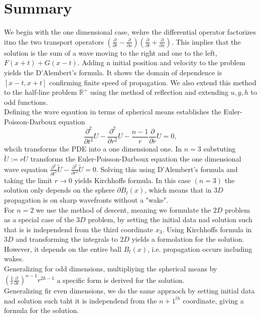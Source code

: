 \documentclass[A4,12pt,twoside]{book}
\begin{document}
\section{Summary}
We begin with the one dimensional case, wehre the differential operator factorizes itno the two transport operators $(\frac{\partial}{\partial t} - \frac{\partial}{\partial x}) (\frac{\partial}{\partial t} + \frac{\partial}{\partial x})$. This implies that the solution is the sum of a wave moving to the right and one to the left, $F(x+t)+G(x-t)$. Adding n initial position and velocity to the problem yields the D'Alembert's formula. It shows the domain of dependence is $[x-t,x+t]$ confirming finite speed of propagation. We also extend this method to the half-line problem $\mathbb{R}^+$ using the method of reflection and extending $u,g,h$ to odd functions.\\
Defining the wave eqaution in terms of spherical means establishes the Euler-Poisson-Darboux equation 
\[
\frac{\partial^2}{\partial t^2} U - \frac{\partial^2}{\partial r^2} U - \frac{n-1}{r} \frac{\partial}{\partial r} U =0,
\]
whcih transforms the PDE into a one dimensional one. In $n=3$ substuting $\tilde{U} := r U$ transforms the Euler-Poisson-Darboux equation the one dimensional wave equation $\frac{\partial^2}{\partial t^2} \tilde{U} - \frac{\partial^2}{\partial r^2} \tilde{U} =0$. Solving this using D'Alembert's formula and taking the limit $r \to 0$ yields Kirchhoffs formula. In this case $(n=3)$ the solution only depends on the sphere $\partial B_t (x)$, which means that in $3D$ propagation is on sharp wavefronts without a "wake". \\
For $n=2$ we use the method of descent, meaning we formulate the $2D$ problem as a special case of the $3D$ problem, by setting the initial data nad solution such that is is independend from the third coordinate $x_3$. Using Kirchhoffs formula in $3D$ and transforming the integrals to $2D$ yields a formolation for the solution. However, it depends on the entire ball $B_t (x)$, i.e. propagation occurs including wakes.\\
Generalizing for odd dimensions, multipliying the spherical means by $\left( \frac{1}{r} \frac{\partial}{\partial r} \right)^{n-1} r^{2k-1}$ a specific form is derived for the solution.\\
Generalizing fir even dimensions, we do the same appraoch by setting initial data nad solution such taht it is independend from the $n+1^{th}$ coordinate, giving a formula for the solution.
\end{document}
